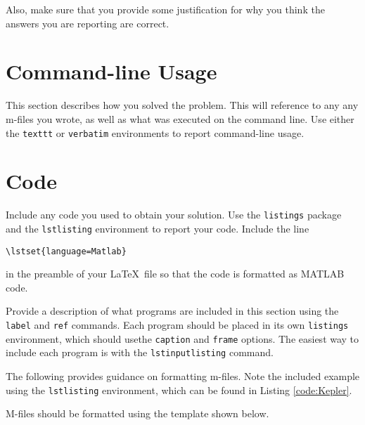 \documentclass[11pt]{article}
\begin{document}
Also, make sure that you provide some justification for why you think the answers you are reporting are correct.

\section{Command-line Usage}

This section describes how you solved the problem.  This will reference to any any m-files you wrote, as well as what was executed on the command line.  Use either the \texttt{texttt} or \texttt{verbatim} environments to report command-line usage.  

\section{Code}

Include any code you used to obtain your solution.  Use the \texttt{listings} package and the \texttt{lstlisting} environment to report your code.  Include the line \begin{verbatim}
\lstset{language=Matlab} \end{verbatim} in the preamble of your \LaTeX\ file so that the code is formatted as MATLAB code.

Provide a description of what programs are included in this section using the \texttt{label} and \texttt{ref} commands.  Each program should be placed in its own \texttt{listings} environment, which should usethe \texttt{caption} and \texttt{frame} options.  The easiest way to include each program is with the \texttt{lstinputlisting} command.


\pagebreak

The following provides guidance on formatting m-files.  Note the included example using the \texttt{lstlisting} environment, which can be found in Listing \ref{code:Kepler}.

M-files should be formatted using the template shown below.  
\end{document}
